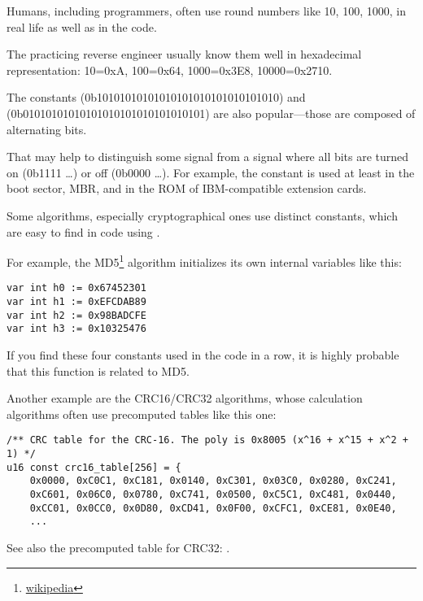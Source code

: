 
Humans, including programmers, often use round numbers like 10, 100, 1000, 
in real life as well as in the code.

The practicing reverse engineer usually know them well in hexadecimal representation:
10=0xA, 100=0x64, 1000=0x3E8, 10000=0x2710.

The constants  (0b10101010101010101010101010101010) and \\
 (0b01010101010101010101010101010101)  are also popular---those
are composed of alternating bits.

That may help to distinguish some signal from a signal where all bits are turned on (0b1111 \dots) or off (0b0000 \dots).
For example, the  constant
is used at least in the boot sector, \ac{MBR}, 
and in the \ac{ROM} of IBM-compatible extension cards.

Some algorithms, especially cryptographical ones use distinct constants, which are easy to find
in code using \IDA.

\newcommand{\URLMD}{http://go.yurichev.com/17111}

For example, the MD5\footnote{\href{\URLMD}{wikipedia}} algorithm initializes its own internal variables like this:

\begin{verbatim}
var int h0 := 0x67452301
var int h1 := 0xEFCDAB89
var int h2 := 0x98BADCFE
var int h3 := 0x10325476
\end{verbatim}

If you find these four constants used in the code in a row, it is highly probable that this function is related to MD5.

\par Another example are the CRC16/CRC32 algorithms, 
whose calculation algorithms often use precomputed tables like this one:

\begin{lstlisting}[caption=linux/lib/crc16.c,style=customc]
/** CRC table for the CRC-16. The poly is 0x8005 (x^16 + x^15 + x^2 + 1) */
u16 const crc16_table[256] = {
	0x0000, 0xC0C1, 0xC181, 0x0140, 0xC301, 0x03C0, 0x0280, 0xC241,
	0xC601, 0x06C0, 0x0780, 0xC741, 0x0500, 0xC5C1, 0xC481, 0x0440,
	0xCC01, 0x0CC0, 0x0D80, 0xCD41, 0x0F00, 0xCFC1, 0xCE81, 0x0E40,
	...
\end{lstlisting}

See also the precomputed table for CRC32: .

